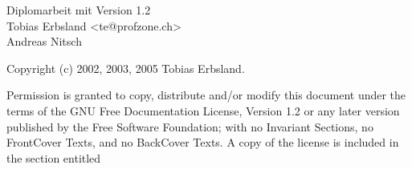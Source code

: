 \begin{titlepage}
\vspace*{7cm}
\begin{center}
\Huge
Diplomarbeit mit 
\vspace{1cm}
\large
Version 1.2\\
\vspace{2cm}
Tobias Erbsland <te@profzone.ch>\\
Andreas Nitsch\\
\end{center}
\normalsize
\vfill
Copyright (c) 2002, 2003, 2005 Tobias Erbsland.

Permission is granted to copy, distribute and/or modify this document
under the terms of the GNU Free Documentation License, Version 1.2
or any later version published by the Free Software Foundation;
with no Invariant Sections, no FrontCover
Texts, and no BackCover
Texts.
A copy of the license is included in the section entitled
\end{titlepage}